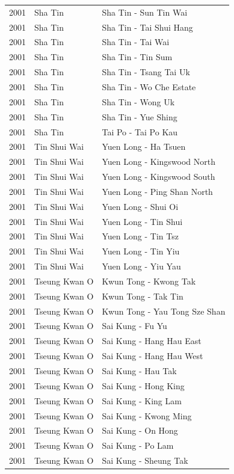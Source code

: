 \begin{longtable}{p{1.2cm}p{3cm}p{7cm}}
2001 & Sha Tin & Sha Tin - Sun Tin Wai \\
2001 & Sha Tin & Sha Tin - Tai Shui Hang \\
2001 & Sha Tin & Sha Tin - Tai Wai \\
2001 & Sha Tin & Sha Tin - Tin Sum \\
2001 & Sha Tin & Sha Tin - Tsang Tai Uk \\
2001 & Sha Tin & Sha Tin - Wo Che Estate \\
2001 & Sha Tin & Sha Tin - Wong Uk \\
2001 & Sha Tin & Sha Tin - Yue Shing \\
2001 & Sha Tin & Tai Po - Tai Po Kau \\
2001 & Tin Shui Wai & Yuen Long - Ha Tsuen \\
2001 & Tin Shui Wai & Yuen Long - Kingswood North \\
2001 & Tin Shui Wai & Yuen Long - Kingswood South \\
2001 & Tin Shui Wai & Yuen Long - Ping Shan North \\
2001 & Tin Shui Wai & Yuen Long - Shui Oi \\
2001 & Tin Shui Wai & Yuen Long - Tin Shui \\
2001 & Tin Shui Wai & Yuen Long - Tin Tsz \\
2001 & Tin Shui Wai & Yuen Long - Tin Yiu \\
2001 & Tin Shui Wai & Yuen Long - Yiu Yau \\
2001 & Tseung Kwan O & Kwun Tong - Kwong Tak \\
2001 & Tseung Kwan O & Kwun Tong - Tak Tin \\
2001 & Tseung Kwan O & Kwun Tong - Yau Tong Sze Shan \\
2001 & Tseung Kwan O & Sai Kung - Fu Yu \\
2001 & Tseung Kwan O & Sai Kung - Hang Hau East \\
2001 & Tseung Kwan O & Sai Kung - Hang Hau West \\
2001 & Tseung Kwan O & Sai Kung - Hau Tak \\
2001 & Tseung Kwan O & Sai Kung - Hong King \\
2001 & Tseung Kwan O & Sai Kung - King Lam \\
2001 & Tseung Kwan O & Sai Kung - Kwong Ming \\
2001 & Tseung Kwan O & Sai Kung - On Hong \\
2001 & Tseung Kwan O & Sai Kung - Po Lam \\
2001 & Tseung Kwan O & Sai Kung - Sheung Tak \\

\end{longtable}
